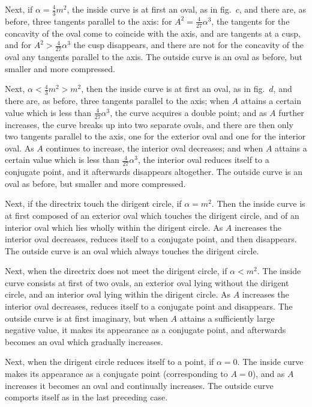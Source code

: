\documentclass[11pt,a4paper]{book}
\begin{document}
\begin{center}
Next, if $\alpha = \tfrac{4}{3}m^{2}$, the inside curve is at first an oval,
as in fig.~$c$, and there are, as before, three tangents parallel
to the axis: for $A^{2} = \tfrac{4}{27}\alpha^{3}$, the tangents for the concavity
of the oval come to coincide with the axis, and are tangents
at a cusp, and for $A^{2} > \tfrac{4}{27}\alpha^{3}$ the cusp disappears, and
there are not for the concavity of the oval any tangents
parallel to the axis.
The outside curve is an oval as before, but smaller and more compressed.

Next, $\alpha < \tfrac{4}{3}m^{2} > m^{2}$, then the inside curve is at first
an oval, as in fig.~$d$, and there are, as before, three tangents
parallel to the axis; when $A$ attains a certain value which is
less than $\tfrac{4}{27}\alpha^{3}$, the curve acquires a double point; and
as $A$ further increases, the curve breaks up into two separate
ovals, and there are then only two tangents parallel to the axis,
\viz{} one for the exterior oval and one for the interior oval.
As $A$ continues to increase, the interior oval decreases; and
when $A$ attains a certain value which is less than $\tfrac{4}{27}\alpha^{3}$,
the interior oval reduces itself to a conjugate point, and it
afterwards disappears altogether.
The outside curve is an oval as before, but smaller and more compressed.

Next, if the directrix touch the dirigent circle, \ie{} if $\alpha = m^{2}$.
Then the inside curve is at first composed of an exterior oval
which touches the dirigent circle, and of an interior oval
which lies wholly within the dirigent circle. As $A$ increases
the interior oval decreases, reduces itself to a conjugate point,
and then disappears. The outside curve is an oval which always
touches the dirigent circle.

Next, when the directrix does not meet the dirigent circle,
\ie{} if $\alpha < m^{2}$. The inside curve consists at first of two ovals,
an exterior oval lying without the dirigent circle, and an interior
oval lying within the dirigent circle. As $A$ increases the interior
oval decreases, reduces itself to a conjugate point and disappears.
The outside curve is at first imaginary, but when $A$ attains a
sufficiently large negative value, it makes its appearance as a
conjugate point, and afterwards becomes an oval which gradually
increases.

Next, when the dirigent circle reduces itself to a point,
\ie{} if $\alpha = 0$. The inside curve makes its appearance as a
conjugate point (corresponding to $A = 0$), and as $A$ increases
it becomes an oval and continually increases. The outside curve
comports itself as in the last preceding case.


\end{center}
\end{document}
